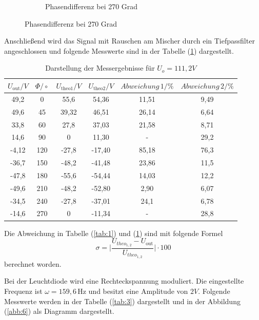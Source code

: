 \begin{figure}[H]
\begin{subfigure}{0.48\textwidth}
  \caption{Phasendifferenz bei 270 Grad}
\end{subfigure}
\end{figure}

Anschließend wird das Signal mit Rauschen am Mischer durch ein Tiefpassfilter angeschlossen und folgende
Messwerte sind in der Tabelle (\ref{tab:2}) dargestellt.
\begin{table}[H]
\centering
\caption{Darstellung der Messergebnisse für $U_o =111,2 V$}
\label{tab:2}
 \begin{tabular}{c c c c c c}
  \toprule
     $U_\text{out} / V$ & $\Phi/\circ$ & $U_\text{theo1} / V$ & $U_\text{theo2} / V$ & $Abweichung \, 1 / \%$ &$Abweichung \, 2 / \%$ \\
  \midrule
  49,2  & 0   & 55,6  &	54,36 & 11,51 & 9,49 \\
  49,6  & 45  & 39,32 & 46,51 & 26,14 & 6,64 \\
  33,8  & 60  & 27,8  & 37,03 & 21,58 & 8,71 \\
  14,6  & 90  &   0   & 11,30 & -     & 29,2 \\
  -4,12 & 120 &-27,8  &-17,40 & 85,18	& 76,3 \\
  -36,7 & 150 &-48,2  &-41,48 & 23,86 & 11,5 \\
  -47,8 & 180 &-55,6  &-54,44 & 14,03 & 12,2 \\
  -49,6 & 210 &-48,2  &-52,80 & 2,90  & 6,07 \\
  -34,5 & 240 &-27,8  &-37,01 & 24,1  & 6,78 \\
  -14,6 & 270 &   0   &-11,34 & -     & 28,8 \\
  \bottomrule
\end{tabular}
\end{table}

Die Abweichung in Tabelle (\ref{tab:1}) und (\ref{tab:2}) sind mit folgende Formel
\begin{equation*}
  \sigma = \biggl| \frac{U_{theo_{1,2}}-U_\text{out}}{U_{theo_{1,2}}} \biggl| \cdot 100
\end{equation*}
berechnet worden.

Bei der Leuchtdiode wird eine Rechteckspannung moduliert. Die eingestellte Frequenz ist $\omega = 159,6 \, \si{\hertz}$ und
besitzt eine Amplitude von $2 V$.
Folgende Messwerte werden in der Tabelle (\ref{tab:3}) dargestellt und in der Abbildung (\ref{abb:6}) als
Diagramm dargestellt.

